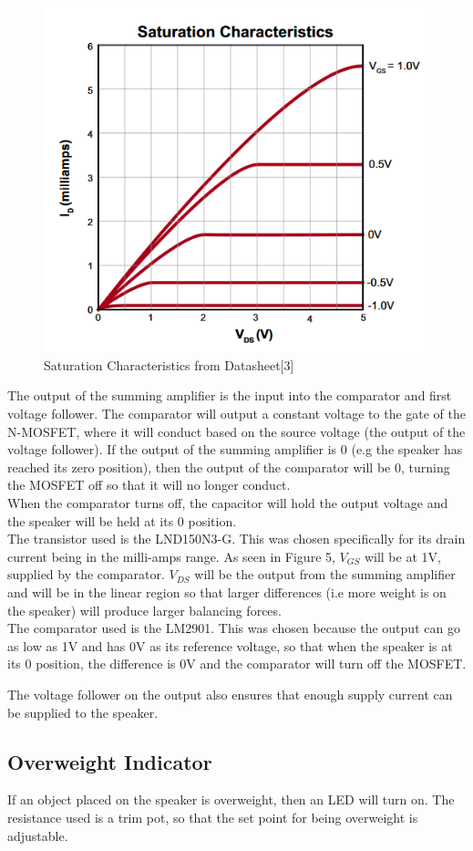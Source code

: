 \documentclass[12pt]{article}
\begin{document}
	\begin{figure}
		\centering
		\includegraphics[width=0.5\columnwidth]{mosfet}
		\caption{Saturation Characteristics from Datasheet[3]}
	\end{figure}
	
	The output of the summing amplifier is the input into the comparator and first voltage follower. The comparator will output a constant voltage to the gate of the N-MOSFET, where it will conduct based on the source voltage (the output of the voltage follower). If the output of the summing amplifier is 0 (e.g the speaker has reached its zero position), then the output of the comparator will be 0, turning the MOSFET off so that it will no longer conduct.\\
	
	When the comparator turns off, the capacitor will hold the output voltage and the speaker will be held at its 0 position.\\
	
	The transistor used is the LND150N3-G. This was chosen specifically for its drain current being in the milli-amps range. As seen in Figure 5, $V_{GS}$ will be at 1V, supplied by the comparator. $V_{DS}$ will be the output from the summing amplifier and will be in the linear region so that larger differences (i.e more weight is on the speaker) will produce larger balancing forces. \\
	
	The comparator used is the LM2901. This was chosen because the output can go as low as 1V and has 0V as its reference voltage, so that when the speaker is at its 0 position, the difference is 0V and the comparator will turn off the MOSFET. 
	
	The voltage follower on the output also ensures that enough supply current can be supplied to the speaker. 
	
	\subsection{Overweight Indicator}
	If an object placed on the speaker is overweight, then an LED will turn on. The resistance used is a trim pot, so that the set point for being overweight is adjustable. \\
	
\end{document}
